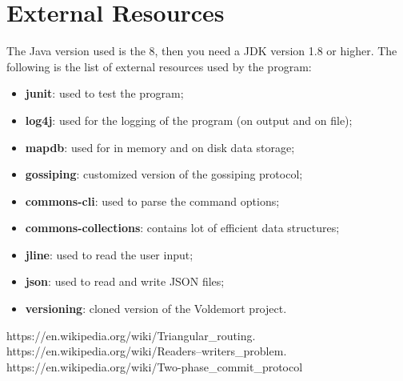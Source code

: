 \documentclass[12pt, a4paper, oneside] {book}
\begin{document}
\chapter{External Resources}

The Java version used is the 8, then you need a JDK version 1.8 or higher.
The following is the list of external resources used by the program:

\begin{itemize}
  \item \textbf{junit}: used to test the program;
  \item \textbf{log4j}: used for the logging of the program (on output and on file);
  \item \textbf{mapdb}: used for in memory and on disk data storage;
  \item \textbf{gossiping}: customized version of the gossiping protocol;
  \item \textbf{commons-cli}: used to parse the command options;
  \item \textbf{commons-collections}: contains lot of efficient data structures;
  \item \textbf{jline}: used to read the user input;
  \item \textbf{json}: used to read and write JSON files;
  \item \textbf{versioning}: cloned version of the Voldemort project.
\end{itemize}

\begin{thebibliography}{}
 
 https://en.wikipedia.org/wiki/Triangular\_routing.
 https://en.wikipedia.org/wiki/Readers–writers\_problem.
 https://en.wikipedia.org/wiki/Two-phase\_commit\_protocol
 
\end{thebibliography}
 
\end{document}
